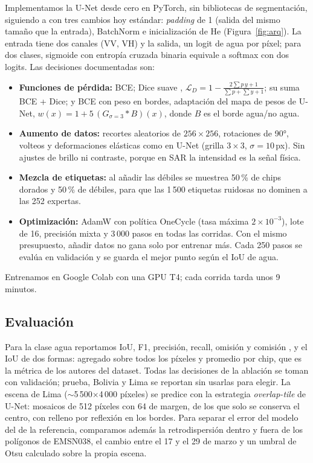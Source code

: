 \documentclass[10pt]{article}
\begin{document}
Implementamos la U-Net desde cero en PyTorch, sin bibliotecas de segmentación, siguiendo a \citet{ronneberger2015} con tres cambios hoy estándar: \emph{padding} de 1 (salida del mismo tamaño que la entrada), BatchNorm \citep{ioffe2015} e inicialización de He \citep{he2015} (Figura~\ref{fig:arq}). La entrada tiene dos canales (VV, VH) y la salida, un logit de agua por píxel; para dos clases, sigmoide con entropía cruzada binaria equivale a softmax con dos logits. Las decisiones documentadas son:
\begin{itemize}
\item \textbf{Funciones de pérdida:} BCE; Dice suave \citep{milletari2016}, $\mathcal{L}_{D}=1-\tfrac{2\sum p\,y+1}{\sum p+\sum y+1}$; su suma BCE + Dice; y BCE con peso en bordes, adaptación del mapa de pesos de U-Net, $w(x)=1+5\,(G_{\sigma=3} * B)(x)$, donde $B$ es el borde agua/no agua.
\item \textbf{Aumento de datos:} recortes aleatorios de $256\times256$, rotaciones de 90°, volteos y deformaciones elásticas como en U-Net (grilla $3\times3$, $\sigma=10$\,px). Sin ajustes de brillo ni contraste, porque en SAR la intensidad es la señal física.
\item \textbf{Mezcla de etiquetas:} al añadir las débiles se muestrea 50\,\% de chips dorados y 50\,\% de débiles, para que las 1\,500 etiquetas ruidosas no dominen a las 252 expertas.
\item \textbf{Optimización:} AdamW \citep{loshchilov2019} con política OneCycle \citep{smith2019} (tasa máxima $2\times10^{-3}$), lote de 16, precisión mixta y 3\,000 pasos en todas las corridas. Con el mismo presupuesto, añadir datos no gana solo por entrenar más. Cada 250 pasos se evalúa en validación y se guarda el mejor punto según el IoU de agua.
\end{itemize}
Entrenamos en Google Colab con una GPU T4; cada corrida tarda unos 9 minutos.

\subsection{Evaluación}
Para la clase agua reportamos IoU, F1, precisión, recall, omisión y comisión \citep{bonafilia2020}, y el IoU de dos formas: agregado sobre todos los píxeles y promedio por chip, que es la métrica de los autores del dataset. Todas las decisiones de la ablación se toman con validación; prueba, Bolivia y Lima se reportan sin usarlas para elegir. La escena de Lima ($\sim$5\,500$\times$4\,000 píxeles) se predice con la estrategia \emph{overlap-tile} de U-Net: mosaicos de 512 píxeles con 64 de margen, de los que solo se conserva el centro, con relleno por reflexión en los bordes. Para separar el error del modelo del de la referencia, comparamos además la retrodispersión dentro y fuera de los polígonos de EMSN038, el cambio entre el 17 y el 29 de marzo y un umbral de Otsu calculado sobre la propia escena.
\end{document}
